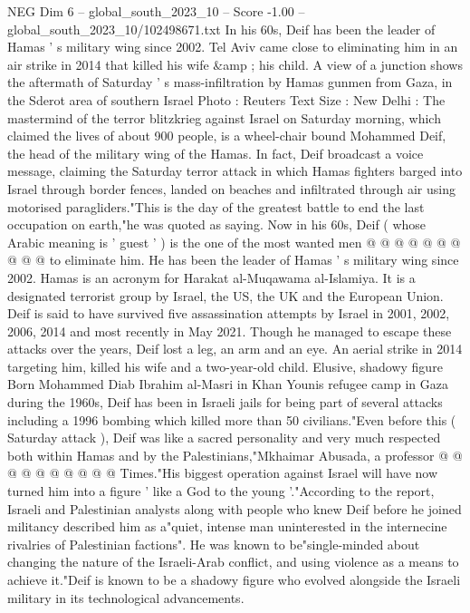 \begin{textsample}{NEG Dim 6 – global\_south\_2023\_10 – Score -1.00 – global\_south\_2023\_10/102498671.txt}  \label{ex:f6_neg_148}
In his 60s, Deif has been the leader of Hamas ' s military wing since 2002.
Tel Aviv came close to eliminating him in an air strike in 2014 that killed his wife \&amp ; his child.
A view of a junction shows the aftermath of Saturday ' s mass-infiltration by Hamas gunmen from Gaza, in the Sderot area of southern Israel Photo : Reuters Text Size : New Delhi : The mastermind of the terror blitzkrieg against Israel on Saturday morning, which claimed the lives of about 900 people, is a wheel-chair bound Mohammed Deif, the head of the military wing of the Hamas.
In fact, Deif broadcast a voice message, claiming the Saturday terror attack in which Hamas fighters barged into Israel through border fences, landed on beaches and infiltrated through air using motorised paragliders."This is the day of the greatest battle to end the last occupation on earth,"he was quoted as saying.
Now in his 60s, Deif ( whose Arabic meaning is ' guest ' ) is the one of the most wanted men @ @ @ @ @ @ @ @ @ @ to eliminate him.
He has been the leader of Hamas ' s military wing since 2002.
Hamas is an acronym for Harakat al-Muqawama al-Islamiya.
It is a designated terrorist group by Israel, the US, the UK and the European Union.
Deif is said to have survived five assassination attempts by Israel in 2001, 2002, 2006, 2014 and most recently in May 2021.
Though he managed to escape these attacks over the years, Deif lost a leg, an arm and an eye.
An aerial strike in 2014 targeting him, killed his wife and a two-year-old child.
Elusive, shadowy figure Born Mohammed Diab Ibrahim al-Masri in Khan Younis refugee camp in Gaza during the 1960s, Deif has been in Israeli jails for being part of several attacks including a 1996 bombing which killed more than 50 civilians."Even before this ( Saturday attack ), Deif was like a sacred personality and very much respected both within Hamas and by the Palestinians,"Mkhaimar Abusada, a professor @ @ @ @ @ @ @ @ @ @ Times."His biggest operation against Israel will have now turned him into a figure ' like a God to the young '."According to the report, Israeli and Palestinian analysts along with people who knew Deif before he joined militancy described him as a"quiet, intense man uninterested in the internecine rivalries of Palestinian factions".
He was known to be"single-minded about changing the nature of the Israeli-Arab conflict, and using violence as a means to achieve it."Deif is known to be a shadowy figure who evolved alongside the Israeli military in its technological advancements.

\end{textsample}
